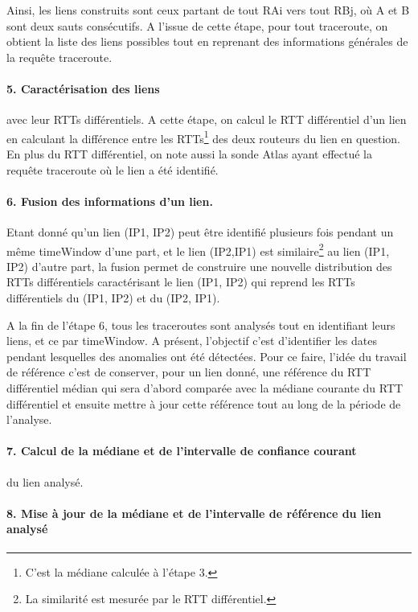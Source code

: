 Ainsi, les liens  construits sont ceux partant de tout RAi vers tout RBj, où A et B sont deux sauts consécutifs. A l'issue de cette étape, pour tout traceroute, on obtient la liste des liens possibles tout en reprenant des informations générales de la requête traceroute.

\paragraph{5. Caractérisation des liens} avec leur RTTs différentiels. A cette étape, on calcul le RTT différentiel d'un lien en calculant la différence entre les RTTs\footnote{C'est la médiane calculée à l'étape 3.} des deux routeurs du lien en question. En plus du RTT différentiel, on note aussi la sonde Atlas ayant effectué la requête traceroute où le lien a été identifié. 

\paragraph{6. Fusion des informations d'un lien. } Etant donné qu'un lien (IP1, IP2) peut être identifié plusieurs fois pendant un même timeWindow d'une part, et le lien (IP2,IP1) est similaire\footnote{La similarité est mesurée par le RTT différentiel.} au lien  (IP1, IP2) d'autre part, la fusion permet de construire une nouvelle distribution des RTTs différentiels caractérisant le lien (IP1, IP2) qui reprend les RTTs différentiels du (IP1, IP2) et du (IP2, IP1).


A la fin de l'étape 6, tous les traceroutes sont analysés tout en identifiant leurs liens, et ce par timeWindow. A présent, l'objectif c'est d'identifier les dates pendant lesquelles des anomalies ont été détectées. Pour ce faire, l'idée du travail de référence c'est de conserver, pour un lien donné, une référence du RTT différentiel médian qui sera d'abord comparée avec la médiane courante du RTT différentiel et ensuite mettre à jour cette référence tout au long de la période de l'analyse.

  
  \paragraph{7. Calcul de la médiane et de  l'intervalle de confiance courant } du lien analysé.
  
  \paragraph{8. Mise à jour de la médiane et de l'intervalle de  référence du lien analysé}
  
